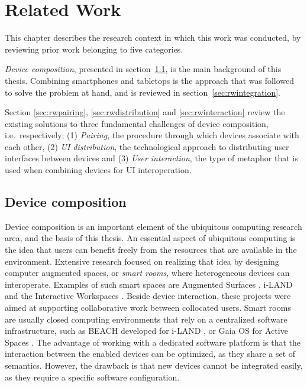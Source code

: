 \chapter{Related Work}
\label{relatedwork}

This chapter describes the research context in which this work was conducted, by reviewing prior work belonging to five categories.

\emph{Device composition}, presented in section~\ref{sec:rwcomposition}, is the main background of this thesis.
Combining smartphones and tabletops is the approach that was followed to solve the problem at hand, and is reviewed in section~\ref{sec:rwintegration}.

Section \ref{sec:rwpairing}, \ref{sec:rwdistribution} and \ref{sec:rwinteraction} review the existing solutions to three fundamental challenges of device composition, i.e.\ respectively;
(1) \emph{Pairing}, the procedure through which devices associate with each other,
(2) \emph{UI distribution}, the technological approach to distributing user interfaces between devices
and (3) \emph{User interaction}, the type of metaphor that is used when combining devices for UI interoperation.

\section{Device composition}
\label{sec:rwcomposition}

Device composition is an important element of the ubiquitous computing research area, and the basis of this thesis.
An essential aspect of ubiquitous computing is the idea that users can benefit freely from the resources that are available in the environment.
Extensive research focused on realizing that idea by designing computer augmented spaces, or \emph{smart rooms}, where heterogeneous devices can interoperate.
Examples of such smart spaces are Augmented Surfaces \citep{Rekimoto:1999:augmentedsurfaces}, 
\mbox{i-LAND} \citep{Streitz:1999:iland} and the Interactive Workspaces \citep{Johanson:2002:iroom}.
Beside device interaction, these projects were aimed at supporting collaborative work between collocated users.
Smart rooms are usually closed computing environments that rely on a centralized software infrastructure, such as BEACH developed for i-LAND \citep{Tandler:2001:smartenv}, or Gaia OS for Active Spaces \citep{Roman:2002:gaia}.
The advantage of working with a dedicated software platform is that the interaction between the enabled devices can be optimized, as they share a set of semantics.
However, the drawback is that new devices cannot be integrated easily, as they require a specific software configuration.

